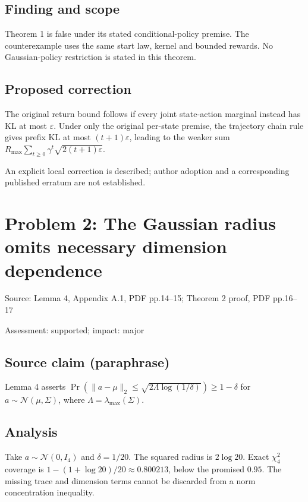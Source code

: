 \documentclass[11pt]{article}
\begin{document}
\subsection*{Finding and scope}

Theorem 1 is false under its stated conditional-policy premise. The counterexample uses the same start law, kernel and bounded rewards. No Gaussian-policy restriction is stated in this theorem.

\subsection*{Proposed correction}

The original return bound follows if every joint state-action marginal instead has KL at most \(\varepsilon\). Under only the original per-state premise, the trajectory chain rule gives prefix KL at most \((t+1)\varepsilon\), leading to the weaker sum \(R_{\max}\sum_{t\geq0}\gamma^t\sqrt{2(t+1)\varepsilon}\).

An explicit local correction is described; author adoption and a corresponding published erratum are not established.

\section*{Problem 2: The Gaussian radius omits necessary dimension dependence}

Source: Lemma 4, Appendix A.1, PDF pp.14–15; Theorem 2 proof, PDF pp.16–17

Assessment: supported; impact: major

\subsection*{Source claim (paraphrase)}

Lemma 4 asserts \(\Pr(\|a-\mu\|_2\leq\sqrt{2\Lambda\log(1/\delta)})\geq1-\delta\) for \(a\sim\mathcal N(\mu,\Sigma)\), where \(\Lambda=\lambda_{\max}(\Sigma)\).

\subsection*{Analysis}

Take \(a\sim\mathcal N(0,I_4)\) and \(\delta=1/20\). The squared radius is \(2\log20\). Exact \(\chi^2_4\) coverage is \(1-(1+\log20)/20\approx0.800213\), below the promised \(0.95\). The missing trace and dimension terms cannot be discarded from a norm concentration inequality.
\end{document}
